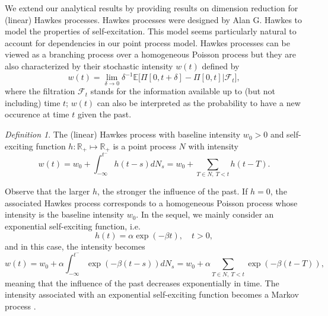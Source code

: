 \documentclass[aos]{imsart}
\theoremstyle{plain}
\theoremstyle{remark}
\newtheorem{definition}[theorem]{Definition}
\newcommand{\R}{\mathbb{R}}
\newcommand{\1}{1}
\begin{document}
We extend our analytical results by providing results on dimension reduction for (linear) Hawkes processes. Hawkes processes were designed by Alan G. Hawkes \cite{Hawkes71a, Hawkes71b} to model the properties of self-excitation. This model seems particularly natural to account for dependencies in our point process model. Hawkes processes can be viewed as a branching process over a homogeneous Poisson process but they are also characterized by their stochastic intensity $w(t)$ defined by 
\[w(t)=\lim_{\delta\to 0}\delta^{-1}\mathbb E\Big[\Pi[0,t+\delta]-\Pi[0,t]|{\mathcal F}_t\Big],\]
where the filtration ${\mathcal F}_t$ stands for the information available up to (but not including) time $t$; $w(t)$ can also be interpreted as the probability to have a new occurence at time $t$ given the past.
\begin{definition}	
The (linear) Hawkes process with baseline intensity $w_0>0$ and self-exciting function $h:\R_+\longmapsto\R_+$ is a point process $N$ with intensity
\begin{equation}\label{H-intensity}
w(t)=w_0+\int_{-\infty}^{t^-}h(t-s)dN_s=w_0+\sum_{T\in N, \ T<t}h(t-T).
\end{equation}
\end{definition}
Observe that the larger $h$, the stronger the influence of the past. If $h=0$, the associated Hawkes process corresponds to a homogeneous Poisson process whose intensity is the baseline intensity $w_0$. In the sequel, we mainly consider an exponential self-exciting function, i.e.
\begin{equation}\label{h-exp}
h(t)=\alpha\exp(-\beta t),\quad t>0,
\end{equation}
and in this case, the intensity becomes
\[
w(t)=w_0+\alpha\int_{-\infty}^{t^-}\exp(-\beta (t-s))dN_s=w_0+\alpha\sum_{T\in N, \ T<t}\exp(-\beta (t-T)),
\]
meaning that the influence of the past decreases exponentially in time. The intensity associated with an exponential self-exciting function becomes a Markov process \cite{Oakes75}.
\end{document}
